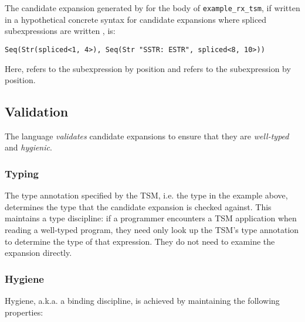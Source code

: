 The candidate expansion generated by  for the body of \lstinline{example_rx_tsm}, if written in a hypothetical concrete syntax for candidate expansions where spliced subexpressions are written , is:
\begin{lstlisting}[numbers=none]
Seq(Str(spliced<1, 4>), Seq(Str "SSTR: ESTR", spliced<8, 10>))
\end{lstlisting}
Here,  refers to the subexpression  by position and  refers to the subexpression  by position. 


\subsection{Validation}\label{sec:uetsms-validation}
The language \emph{validates} candidate expansions to ensure that they are \emph{well-typed} and \emph{hygienic}. 

\subsubsection{Typing}
The type annotation specified by the TSM, i.e. the type  in the example above, determines the type that the candidate expansion is checked against. This maintains a type discipline: if a programmer encounters a TSM application when reading a well-typed program, they need only look up the TSM's type annotation to determine the type of that expression. They do not need to examine the expansion directly. 

\subsubsection{Hygiene}
Hygiene, a.k.a. a binding discipline, is achieved by maintaining the following properties:

